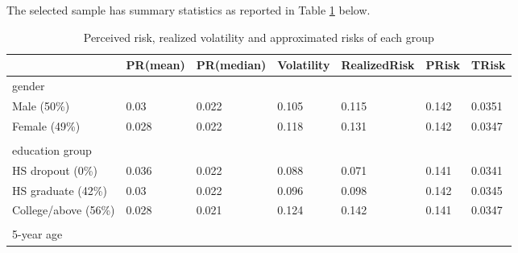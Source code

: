 The selected sample has summary statistics as reported in Table \ref{tab:sipp_sum_stat} below. 

\begin{table}[!ht]
    \centering
    \caption{Perceived risk, realized volatility and approximated risks of each group}
    \label{tab:sipp_sum_stat}
  \begin{tabular}{lllllll}
  \hline\hline 
                     & PR(mean) & PR(median) & Volatility & RealizedRisk & PRisk & TRisk \\
                     \hline 

gender               &               &                       &                         &                   &               &              \\
\hline 
Male (50\%)             & 0.03          & 0.022                 & 0.105                   & 0.115             & 0.142         & 0.0351       \\
Female (49\%)             & 0.028         & 0.022                 & 0.118                   & 0.131             & 0.142         & 0.0347       \\
                     &               &                       &                         &                   &               &              \\
                     \hline 

\multicolumn{2}{l}{education group}  &                       &                         &                   &               &              \\
\hline 

HS dropout (0\%)     & 0.036         & 0.022                 & 0.088                   & 0.071             & 0.141         & 0.0341       \\
HS graduate (42\%)   & 0.03          & 0.022                 & 0.096                   & 0.098             & 0.142         & 0.0345       \\
College/above (56\%) & 0.028         & 0.021                 & 0.124                   & 0.142             & 0.141         & 0.0347       \\
                     &               &                       &                         &                   &               &              \\
                     \hline 

5-year age           &               &                       &                         &                   &               &   \\
\hline 


\end{tabular}
\end{table}
